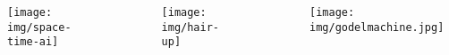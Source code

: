 \documentclass[UTF8,11pt,colorlinks,compress,openany]{beamer}%
\begin{document}
\begin{frame}\frametitle{}
\begin{columns}[onlytextwidth]
	\begin{figure}
		\texttt{[image: img/space-time-ai]}
	\end{figure}\vspace{-5ex}
	\begin{figure}[H]
		\begin{center}
			\texttt{[image: img/hair-up]}
		\end{center}
	\end{figure}
	\begin{figure}
		\texttt{[image: img/godelmachine.jpg]}
	\end{figure}
\end{columns}
\end{frame}
\end{document}
